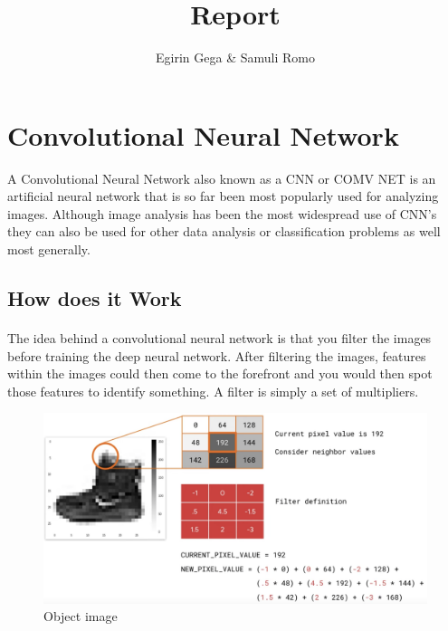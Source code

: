 \documentclass{article}
\title{Report}
\author{Egirin Gega \&  Samuli Romo}
\begin{document}
  \maketitle

  \newpage
  \tableofcontents
  \newpage
  \listoffigures
  \newpage
  \listoftables

  \newpage
  \section{Convolutional Neural Network}
  A Convolutional Neural Network also known as a CNN or COMV NET is an artificial neural network that is so far been most popularly used for analyzing images. Although image analysis has been the most widespread use of CNN's they can also be used for other data analysis or classification problems as well most generally.
  \subsection{How does it Work}
    \paragraph{}
    The idea behind a convolutional neural network is that you filter the images before training the deep neural network. After filtering the images, features within the images could then come to the forefront and you would then spot those features to identify something.
    A filter is simply a set of multipliers. 
    \vspace{20mm}
    \begin{figure}[h!]
      \begin{center}
        \includegraphics[width=\linewidth]{img/img2.png}
        \caption{Object image}
        \label{fig:snn}
      \end{center}
    \end{figure}
\end{document}
